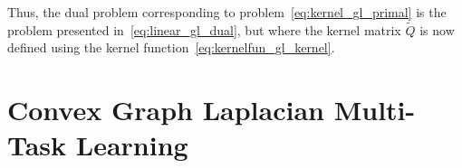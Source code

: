 Thus, the dual problem corresponding to problem~\eqref{eq:kernel_gl_primal} is the problem presented in~\eqref{eq:linear_gl_dual}, but where the kernel matrix $\widetilde{Q}$ is now defined using the kernel function~\eqref{eq:kernelfun_gl_kernel}.



\section{Convex Graph Laplacian Multi-Task Learning}
\label{sec:convexgl}


